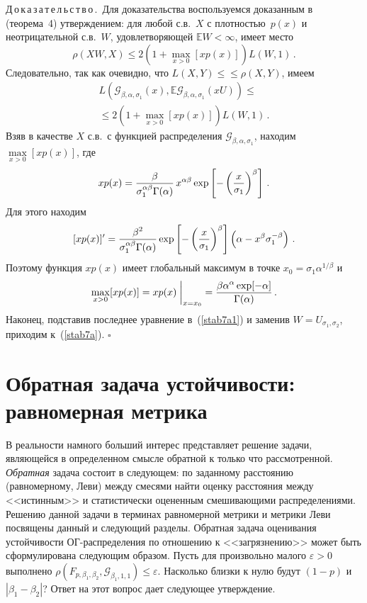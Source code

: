 \begin{multicols}{2}
\noindent
Д\,о\,к\,а\,з\,а\,т\,е\,л\,ь\,с\,т\,в\,о\,.\
Для доказательства воспользуемся доказанным в~\cite{Hall1979}
(теорема~4) утверждением: для любой с.в.~$X$ с плотностью~$p(x)$
и неотрицательной с.в.~$W$, удовлетворяющей ${\mathbb
E}W<\infty$, имеет место
$$
\rho (XW,X) \leqslant 2\left(1+\max\limits_{x>0} [xp(x)]\right) L(W,1)\,.
$$
Следовательно, так как очевидно, что $L(X,Y) \leqslant$\linebreak $\leqslant \rho (X,Y)$, имеем
\begin{multline}
L({\mathcal G}_{\beta,\alpha,\sigma_1}(x),{\mathbb E}{\mathcal
G}_{\beta,\alpha,\sigma_1}(xU)) \leqslant{}\\
{}\leqslant
2\left(1+\max\limits_{x>0} [xp(x)]\right) L(W,1)\,. \label{stab7a1}
\end{multline}
Взяв в качестве $X$ с.в.\ с функцией распределения ${\mathcal
G}_{\beta,\alpha,\sigma_1}$, находим $\max\limits_{x>0} [xp(x)]$,
где
$$
xp(x)=
\displaystyle\frac{\displaystyle \beta\mathstrut}{\displaystyle \sigma_1^{\alpha\beta}\Gamma(\alpha)\mathstrut}\,x^{\alpha\beta}\exp\left[-\left(
\displaystyle\frac{\displaystyle x\mathstrut}{\displaystyle \sigma_1\mathstrut}\right)^\beta\right]\,.
$$
Для этого находим
$$
[xp(x)]^{\prime} = \displaystyle\frac{\displaystyle \beta^2\mathstrut}{\displaystyle \sigma_1^{\alpha\beta}\Gamma(\alpha)\mathstrut}
\exp\left[-\left(\displaystyle\frac{\displaystyle x\mathstrut}{\displaystyle \sigma_1\mathstrut}\right)^\beta\right] \left(
\alpha - x^{\beta}\sigma_1^{-\beta}\right)\,.
$$
Поэтому функция $xp(x)$ имеет глобальный максимум в точке $x_0 =
\sigma_1\alpha^{1/\beta}$ и
$$
\max\limits_{x>0} [xp(x)] = xp(x)\;\biggl|_{x=x_0}\; =
\displaystyle\frac{\displaystyle \beta\alpha^{\alpha}\exp[-\alpha]\mathstrut}{\displaystyle \Gamma(\alpha)\mathstrut}\,.
$$
Наконец, подставив последнее уравнение в~(\ref{stab7a1}) и заменив
$W= U_{\sigma_1,\sigma_2}$, приходим к~(\ref{stab7a}). \hfill$\square$


\section{Обратная задача устойчивости: равномерная метрика}

В реальности намного больший интерес представляет решение задачи,
являющейся в определенном смысле обратной к только что
рассмотренной. {\it Обратная} задача состоит в следующем: по
заданному расстоянию (равномерному, Леви) между смесями найти
оценку расстояния между <<истинным>> и статистически оцененным
смешивающими распределениями. Решению данной задачи в терминах
равномерной метрики и метрики Леви посвящены данный и следующий
разделы. Обратная задача оценивания устойчивости ОГ-рас\-пре\-де\-ле\-ния
по отношению к <<загрязнению>> может быть сформулирована следующим
образом. Пусть для произвольно малого $\varepsilon>0$ выполнено
$\rho(F_{p,\beta_1,\beta_2}, {\mathcal G}_{\beta_1,1,1} )
\leqslant \varepsilon.$ Насколько близки к нулю будут $(1-p)$ и
$|\beta_1-\beta_2|$? Ответ на этот вопрос дает следующее
утверждение.


\end{multicols}
